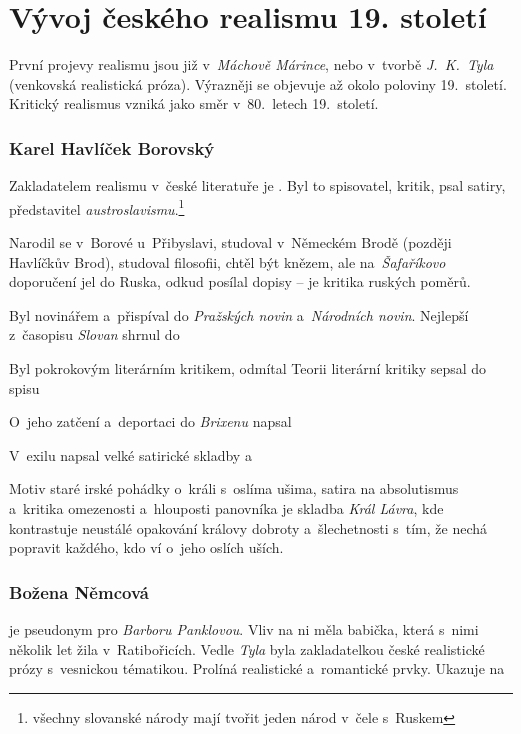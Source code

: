 \chapter[Vývoj českého realismu]{Vývoj českého realismu 19. století}
První projevy realismu jsou již v~\emph{Máchově Márince}, nebo  v~tvorbě
\emph{J.~K.~Tyla} (venkovská realistická próza). Výrazněji se objevuje
až okolo poloviny 19.~století. Kritický realismus vzniká jako směr
v~80.~letech 19.~století.

\subsection*{Karel Havlíček Borovský}
Zakladatelem realismu v~české literatuře je .  Byl to spisovatel, kritik, psal satiry, představitel
\emph{austroslavismu}.\footnote{všechny slovanské národy mají tvořit jeden národ v~čele s~Ruskem}

Narodil se v~Borové u~Přibyslavi, studoval v~Německém Brodě (později
Havlíčkův Brod), studoval filosofii, chtěl být knězem,
ale na~\emph{Šafaříkovo} doporučení jel do Ruska, odkud posílal dopisy --
 je kritika ruských poměrů.

Byl novinářem a~přispíval do \emph{Pražských novin} a~\emph{Národních novin}.
Nejlepší z~časopisu \emph{Slovan} shrnul do 

Byl pokrokovým literárním kritikem, odmítal 
Teorii literární kritiky sepsal do spisu 

O~jeho zatčení a~deportaci do \emph{Brixenu} napsal 

V~exilu napsal velké satirické skladby  a~  

Motiv staré irské pohádky o~králi s~oslíma ušima, satira na absolutismus
a~kritika omezenosti a~hlouposti panovníka je skladba \emph{Král Lávra},
kde kontrastuje neustálé opakování královy dobroty a~šlechetnosti s~tím,
že nechá popravit každého, kdo ví o~jeho oslích uších.

\subsection*{Božena Němcová}
 je pseudonym pro \emph{Barboru Panklovou}. Vliv
na ni měla babička, která s~nimi několik let žila v~Ratibořicích. Vedle
\emph{Tyla} byla zakladatelkou české realistické prózy s~vesnickou
tématikou. Prolíná realistické a~romantické prvky. Ukazuje na

